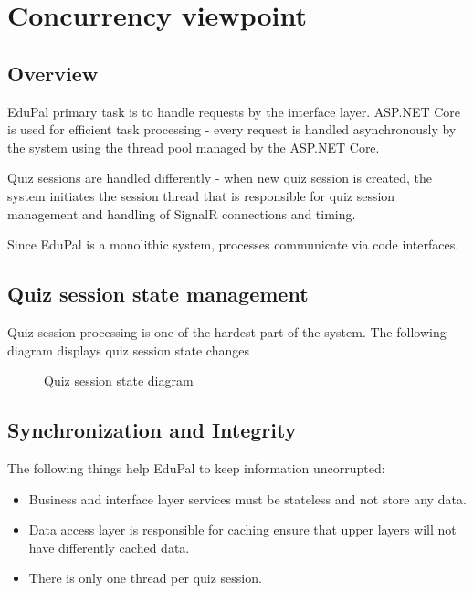 \section{Concurrency viewpoint}

\subsection{Overview}

EduPal primary task is to handle requests by the interface layer. ASP.NET Core is used for efficient task processing - every request is handled asynchronously by the system using the thread pool managed by the ASP.NET Core.

Quiz sessions are handled differently - when new quiz session is created, the system initiates the session thread that is responsible for quiz session management and handling of SignalR connections and timing.

Since EduPal is a monolithic system, processes communicate via code interfaces.

\subsection{Quiz session state management}

Quiz session processing is one of the hardest part of the system. The following diagram displays quiz session state changes

\begin{figure}[H]
  \caption{Quiz session state diagram}
  \label{fig:concurrency-viewpoint-quiz-session-state}
\end{figure}

\subsection{Synchronization and Integrity}

The following things help EduPal to keep information uncorrupted:

\begin{itemize}
  \item Business and interface layer services must be stateless and not store any data.
  \item Data access layer is responsible for caching ensure that upper layers will not have differently cached data.
  \item There is only one thread per quiz session.
\end{itemize}

